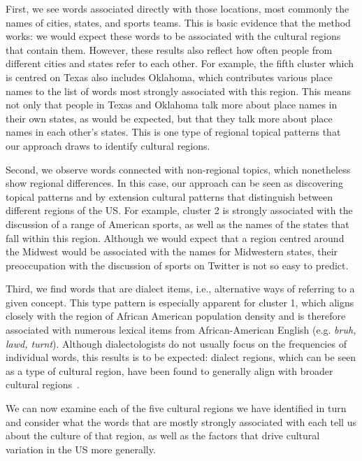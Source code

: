 \documentclass[../thesis.tex]{subfiles}
\begin{document}
First, we see words associated directly with those locations, most commonly the names of
cities, states, and sports teams. This is basic evidence that the method works: we would
expect these words to be associated with the cultural regions that contain them.
However, these results also reflect how often people from different cities and states
refer to each other. For example, the fifth cluster which is centred on Texas also
includes Oklahoma, which contributes various place names to the list of words most
strongly associated with this region. This means not only that people in Texas and
Oklahoma talk more about place names in their own states, as would be expected, but that
they talk more about place names in each other's states. This is one type of regional
topical patterns that our approach draws to identify cultural regions.

Second, we observe words connected with non-regional topics, which nonetheless show
regional differences. In this case, our approach can be seen as discovering topical
patterns and by extension cultural patterns that distinguish between different regions
of the US. For example, cluster 2 is strongly associated with the discussion of a range
of American sports, as well as the names of the states that fall within this region.
Although we would expect that a region centred around the Midwest would be associated
with the names for Midwestern states, their preoccupation with the discussion of sports
on Twitter is not so easy to predict. 

Third, we find words that are dialect items, i.e., alternative ways of referring to a
given concept. This type pattern is especially apparent for cluster 1, which aligns
closely with the region of African American population density and is therefore
associated with numerous lexical items from African-American English (e.g. \textit{bruh,
lawd, turnt}). Although dialectologists do not usually focus on the frequencies of
individual words, this results is to be expected: dialect regions, which can be seen as
a type of cultural region, have been found to generally align with broader cultural
regions~\cite{GrieveRegionalVariation2016}.

We can now examine each of the five cultural regions we have identified in turn and
consider what the words that are mostly strongly associated with each tell us about the
culture of that region, as well as the factors that drive cultural variation in the US
more generally. 
\end{document}
